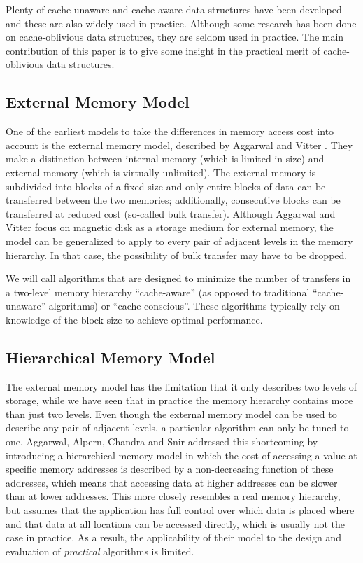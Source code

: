 \documentclass{acm_proc_article-sp}
\begin{document}
Plenty of cache-unaware and cache-aware data structures have been developed and these are also widely used in practice. Although some research has been done on cache-oblivious data structures, they are seldom used in practice. The main contribution of this paper is to give some insight in the practical merit of cache-oblivious data structures.

\subsection{External Memory Model}
One of the earliest models to take the differences in memory access cost into account is the external memory model, described by Aggarwal and Vitter \cite{aggarwal1988ioc}. They make a distinction between internal memory (which is limited in size) and external memory (which is virtually unlimited). The external memory is subdivided into blocks of a fixed size and only entire blocks of data can be transferred between the two memories; additionally, consecutive blocks can be transferred at reduced cost (so-called bulk transfer). Although Aggarwal and Vitter focus on magnetic disk as a storage medium for external memory, the model can be generalized to apply to every pair of adjacent levels in the memory hierarchy. In that case, the possibility of bulk transfer may have to be dropped.

We will call algorithms that are designed to minimize the number of transfers in a two-level memory hierarchy ``cache-aware'' (as opposed to traditional ``cache-unaware'' algorithms) or ``cache-conscious''. These algorithms typically rely on knowledge of the block size to achieve optimal performance.

\subsection{Hierarchical Memory Model}
The external memory model has the limitation that it only describes two levels of storage, while we have seen that in practice the memory hierarchy contains more than just two levels. Even though the external memory model can be used to describe any pair of adjacent levels, a particular algorithm can only be tuned to one. Aggarwal, Alpern, Chandra and Snir \cite{aggarwal1987mhm} addressed this shortcoming by introducing a hierarchical memory model in which the cost of accessing a value at specific memory addresses is described by a non-decreasing function of these addresses, which means that accessing data at higher addresses can be slower than at lower addresses. This more closely resembles a real memory hierarchy, but assumes that the application has full control over which data is placed where and that data at all locations can be accessed directly, which is usually not the case in practice. As a result, the applicability of their model to the design and evaluation of \emph{practical} algorithms is limited.
\end{document}
